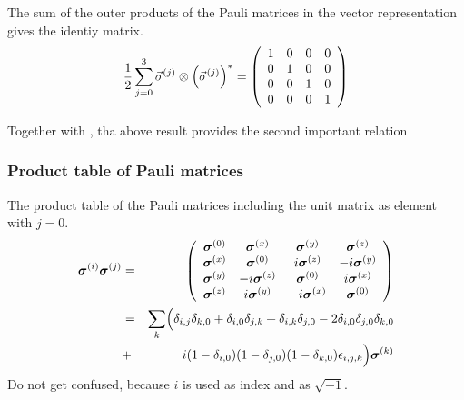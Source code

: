 \documentclass[11pt,a4paper]{report}
\begin{document}
The sum of the outer products of the Pauli matrices in the vector
representation  gives the
identiy matrix.
\begin{eqnarray}
\frac{1}{2}\sum_{j=0}^3\vec{\sigma}^{(j)}\otimes\Bigl(\vec{\sigma}^{(j)}\Bigr)^*
=\left(\begin{array}{cccc}
1&0&0&0\\
0&1&0&0\\
0&0&1&0\\
0&0&0&1
\end{array}\right)
\label{eq:paulidyadicsum1}
\end{eqnarray}

Together with ,
tha above result  provides the second important
relation


\subsubsection{Product table of Pauli matrices}
The product table of the Pauli matrices including the unit matrix as
element with $j=0$.
\begin{eqnarray}
\bm{\sigma}^{(i)}\bm{\sigma}^{(j)}
&=&\left(\begin{array}{cccc}
\bm{\sigma}^{(0)}& \bm{\sigma}^{(x)}  &\bm{\sigma}^{(y)}&\bm{\sigma}^{(z)}\\
\bm{\sigma}^{(x)}& \bm{\sigma}^{(0)} &i\bm{\sigma}^{(z)}&-i\bm{\sigma}^{(y)}\\
\bm{\sigma}^{(y)}&-i\bm{\sigma}^{(z)}&\bm{\sigma}^{(0)} &i\bm{\sigma}^{(x)}\\
\bm{\sigma}^{(z)}& i\bm{\sigma}^{(y)}&-i\bm{\sigma}^{(x)}&\bm{\sigma}^{(0)}\\
\end{array}\right)
\nonumber\\
&=&
\sum_k\Bigl(\delta_{i,j}\delta_{k,0}+
\delta_{i,0}\delta_{j,k}+\delta_{i,k}\delta_{j,0}
-2\delta_{i,0}\delta_{j,0}\delta_{k,0}
\\
&+&i(1-\delta_{i,0})(1-\delta_{j,0})(1-\delta_{k,0})\epsilon_{i,j,k}
\Bigr)\bm{\sigma}^{(k)}
\label{eq:producttablepaulimatrices}
\end{eqnarray}
Do not get confused, because $i$ is used as index and as $\sqrt{-1}$.
\end{document}
